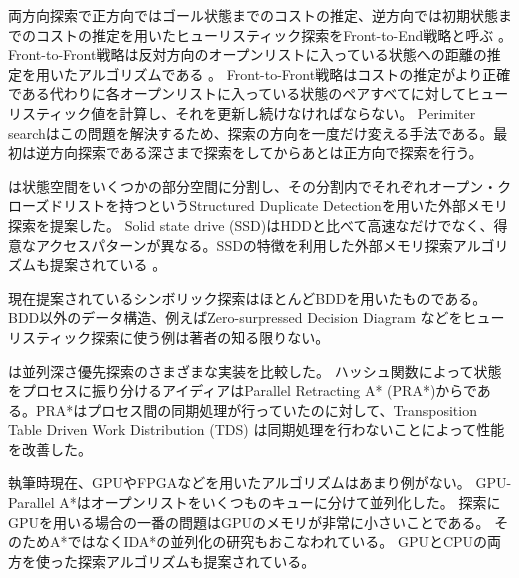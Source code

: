 両方向探索で正方向ではゴール状態までのコストの推定、逆方向では初期状態までのコストの推定を用いたヒューリスティック探索をFront-to-End戦略と呼ぶ \cite{pohl1971bi}。Front-to-Front戦略は反対方向のオープンリストに入っている状態への距離の推定を用いたアルゴリズムである \cite{sint1977improved}。
Front-to-Front戦略はコストの推定がより正確である代わりに各オープンリストに入っている状態のペアすべてに対してヒューリスティック値を計算し、それを更新し続けなければならない。
Perimiter searchはこの問題を解決するため、探索の方向を一度だけ変える手法である\cite{dillenburg1994perimeter,manzini1995bida}。最初は逆方向探索である深さまで探索をしてからあとは正方向で探索を行う。

\cite{zhou2004structured}は状態空間をいくつかの部分空間に分割し、その分割内でそれぞれオープン・クローズドリストを持つというStructured Duplicate Detectionを用いた外部メモリ探索を提案した。
Solid state drive (SSD)はHDDと比べて高速なだけでなく、得意なアクセスパターンが異なる。SSDの特徴を利用した外部メモリ探索アルゴリズムも提案されている \cite{lin2018revisiting}。

現在提案されているシンボリック探索はほとんどBDDを用いたものである。
BDD以外のデータ構造、例えばZero-surpressed Decision Diagram \cite{minato1993zero}などをヒューリスティック探索に使う例は著者の知る限りない。


\cite{kumar1988parallel}は並列深さ優先探索のさまざまな実装を比較した。
ハッシュ関数によって状態をプロセスに振り分けるアイディアはParallel Retracting A* (PRA*)からである\cite{evett1995massively}。PRA*はプロセス間の同期処理が行っていたのに対して、Transposition Table Driven Work Distribution (TDS) \cite{romein1999transposition}は同期処理を行わないことによって性能を改善した。

執筆時現在、GPUやFPGAなどを用いたアルゴリズムはあまり例がない。
GPU-Parallel A*はオープンリストをいくつものキューに分けて並列化した\cite{zhou2015massively}。
探索にGPUを用いる場合の一番の問題はGPUのメモリが非常に小さいことである。
そのためA*ではなくIDA*の並列化の研究もおこなわれている\cite{horie2017block}。
GPUとCPUの両方を使った探索アルゴリズムも提案されている\cite{sulewskiek11}。

% 
% 


